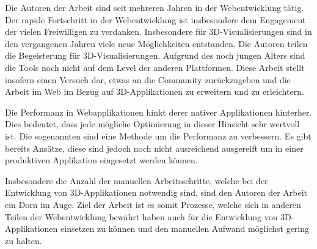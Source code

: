 Die Autoren der Arbeit sind seit mehreren Jahren in der Webentwicklung tätig. Der rapide Fortschritt in der Webentwicklung ist insbesondere dem Engagement der vielen Freiwilligen zu verdanken.
Insbesondere für 3D-Visualisierungen sind in den vergangenen Jahren viele neue Möglichkeiten entstanden. Die Autoren teilen die Begeisterung für 3D-Visualisierungen. Aufgrund des noch jungen Alters sind die Tools noch nicht auf dem Level der anderen Plattformen. Diese Arbeit stellt insofern einen Versuch dar, etwas an die Community zurückzugeben und die Arbeit im Web im Bezug auf 3D-Applikationen zu erweitern und zu erleichtern.

Die Performanz in Webapplikationen hinkt derer nativer Applikationen hinterher. Dies bedeutet, dass jede mögliche Optimierung in dieser Hinsicht sehr wertvoll ist. Die sogenannten  sind eine Methode um die Performanz zu verbessern. Es gibt bereits Ansätze, diese sind jedoch noch nicht ausreichend ausgereift um in einer produktiven Applikation eingesetzt werden können.

Insbesondere die Anzahl der manuellen Arbeitsschritte, welche bei der Entwicklung von 3D-Applikationen notwendig sind, sind den Autoren der Arbeit ein Dorn im Auge. Ziel der Arbeit ist es somit Prozesse, welche sich in anderen Teilen der Webentwicklung bewährt haben auch für die Entwicklung von 3D-Applikationen einsetzen zu können und den manuellen Aufwand möglichst gering zu halten.
